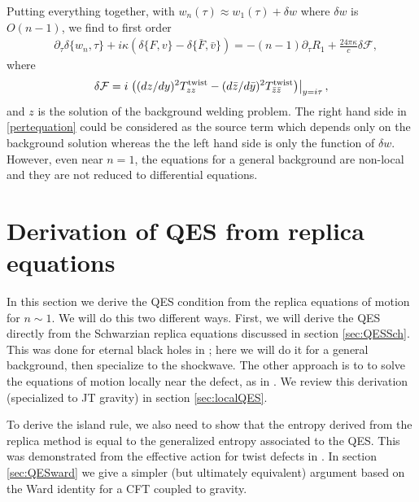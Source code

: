 \documentclass[11pt,oneside,letterpaper]{article}
\newcommand{\p}{\partial}
\newcommand{\f}{\frac}
\let\l=\lambda \let\m=\mu \let\n=\nu \let\x=\xi \let\p=\phi \let\r=v
\let\f=\frac
\let\pa=\partial
\def\ba{\begin{eqnarray}}
\def\ea{\end{eqnarray}}
\renewcommand{\p}{\partial}
\numberwithin{equation}{section}
\def\m{{\mu}}
\def\n{{\nu}}
\def\p{{\phi}}
\newcommand{\bz}{\bar{z}}
\def\ba{\begin{eqnarray}}
\def\ea{\end{eqnarray}}
\def\r{\rightarrow}
\def\f {\frac}
\def\l{\left}
\def\r{\right}
\def\x{\bar{x}}
\renewcommand{\p}{\partial}
\newcommand{\by}{\bar{y}}
\begin{document}
\begin{spacing}{1.1}
Putting everything together, with $w_n (\tau) \approx w_1(\tau) + \delta w$ where $\delta w$ is $O(n-1)$, we find to first order 
\begin{align}\label{pertequation}
& \pa_\tau \delta \{ w_n,\tau\} + i \kappa (\delta \{F, v\} - \delta \{ \bar{F},\bar{v} \} )  = - (n-1)\pa_\tau R_1 + \f{24 \pi \kappa}{c} \delta \mathcal{F} , 
\end{align}
where   
\ba \delta {\cal F}=  i  \l. \l( (dz/dy)^2  T_{zz}^{\rm twist}   - (d\bz/d\by)^2 T_{\bz \bz}^{\rm twist}    \r) \r|_{y= i \tau} ,
\ea
and $z$ is the solution of the background welding problem. The right hand side in \eqref{pertequation} could be considered as the source term which depends only on the background solution whereas the the left hand side is only the function of $\delta w$. However, even near $n=1$, the equations for a general background are non-local and they are not reduced to differential equations.



\section{Derivation of QES from replica equations}\label{sec:qesreplica}

In this section we derive the QES condition from the replica equations of motion for $n \sim 1$. We will do this two different ways. First, we will derive the QES directly from the Schwarzian replica equations discussed in section \ref{sec:QESSch}. This was done for eternal black holes in \cite{Almheiri:2019qdq,Penington:2019kki}; here we will do it for a general background, then specialize to the shockwave. The other approach is to to solve the equations of motion locally near the defect, as in \cite{Lewkowycz:2013nqa, Dong:2017xht}. We review this derivation (specialized to JT gravity) in section \ref{sec:localQES}.

To derive the island rule, we also need to show that the entropy derived from the replica method is equal to the generalized entropy associated to the QES. This was demonstrated from the effective action for twist defects in \cite{Almheiri:2019qdq,Penington:2019kki}. In section \ref{sec:QESward} we give a simpler (but ultimately equivalent) argument based on the  Ward identity for a CFT coupled to gravity.



\end{spacing}
\end{document}

